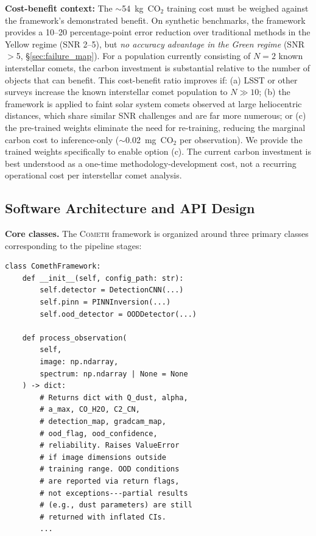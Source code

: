 \documentclass[usenatbib]{mnras}
\begin{document}
\textbf{Cost-benefit context:} The $\sim$54~kg~CO$_2$ training cost must be weighed against the framework's demonstrated benefit. On synthetic benchmarks, the framework provides a 10--20 percentage-point error reduction over traditional methods in the Yellow regime (SNR 2--5), but \textit{no accuracy advantage in the Green regime} (SNR $>$5, \S\ref{sec:failure_map}). For a population currently consisting of $N=2$ known interstellar comets, the carbon investment is substantial relative to the number of objects that can benefit. This cost-benefit ratio improves if: (a) LSST or other surveys increase the known interstellar comet population to $N \gg 10$; (b) the framework is applied to faint solar system comets observed at large heliocentric distances, which share similar SNR challenges and are far more numerous; or (c) the pre-trained weights eliminate the need for re-training, reducing the marginal carbon cost to inference-only ($\sim$0.02~mg~CO$_2$ per observation). We provide the trained weights specifically to enable option (c). The current carbon investment is best understood as a one-time methodology-development cost, not a recurring operational cost per interstellar comet analysis.

\subsection{Software Architecture and API Design}\label{sec:api}

\textbf{Core classes.} The \textsc{Cometh} framework is organized around three primary classes corresponding to the pipeline stages:

{\footnotesize
\begin{verbatim}
class ComethFramework:
    def __init__(self, config_path: str):
        self.detector = DetectionCNN(...)
        self.pinn = PINNInversion(...)
        self.ood_detector = OODDetector(...)

    def process_observation(
        self,
        image: np.ndarray,
        spectrum: np.ndarray | None = None
    ) -> dict:
        # Returns dict with Q_dust, alpha,
        # a_max, CO_H2O, C2_CN,
        # detection_map, gradcam_map,
        # ood_flag, ood_confidence,
        # reliability. Raises ValueError
        # if image dimensions outside
        # training range. OOD conditions
        # are reported via return flags,
        # not exceptions---partial results
        # (e.g., dust parameters) are still
        # returned with inflated CIs.
        ...
\end{verbatim}
}
\end{document}
